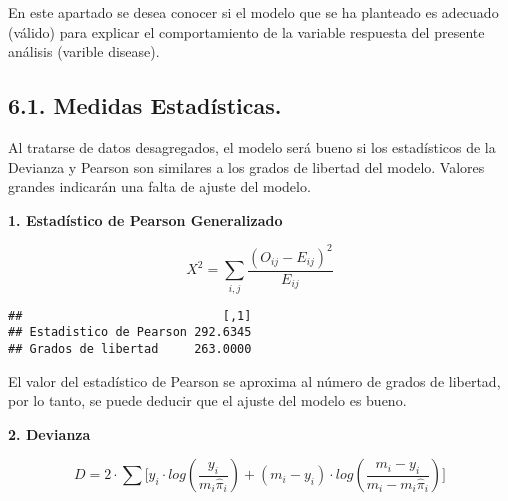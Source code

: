 \documentclass[]{article}
\newenvironment{Shaded}{\begin{snugshade}}{\end{snugshade}}
\newcommand{\KeywordTok}[1]{\textcolor[rgb]{0.13,0.29,0.53}{\textbf{#1}}}
\newcommand{\DecValTok}[1]{\textcolor[rgb]{0.00,0.00,0.81}{#1}}
\newcommand{\StringTok}[1]{\textcolor[rgb]{0.31,0.60,0.02}{#1}}
\newcommand{\CommentTok}[1]{\textcolor[rgb]{0.56,0.35,0.01}{\textit{#1}}}
\newcommand{\OperatorTok}[1]{\textcolor[rgb]{0.81,0.36,0.00}{\textbf{#1}}}
\newcommand{\NormalTok}[1]{#1}
\begin{document}
En este apartado se desea conocer si el modelo que se ha planteado es
adecuado (válido) para explicar el comportamiento de la variable
respuesta del presente análisis (varible disease).

\subsection{6.1. Medidas Estadísticas.}\label{medidas-estadisticas.}

Al tratarse de datos desagregados, el modelo será bueno si los
estadísticos de la Devianza y Pearson son similares a los grados de
libertad del modelo. Valores grandes indicarán una falta de ajuste del
modelo.

\textbf{1. Estadístico de Pearson Generalizado}

\[X^2=\sum_{i,j}{\frac{(O_{ij}-E_{ij})^2}{E_{ij}}}\]

\begin{Shaded}
\end{Shaded}

\begin{verbatim}
##                            [,1]
## Estadistico de Pearson 292.6345
## Grados de libertad     263.0000
\end{verbatim}

El valor del estadístico de Pearson se aproxima al número de grados de
libertad, por lo tanto, se puede deducir que el ajuste del modelo es
bueno.

\textbf{2. Devianza}

\[D=2 \cdot \sum{\big[y_i \cdot log(\frac{y_i}{m_i\hat{\pi}_i})  +  (m_i - y_i) \cdot log(\frac{m_i - y_i}{m_i - m_i\hat{\pi}_i})  \big]}\]

\begin{Shaded}
\end{Shaded}
\end{document}

